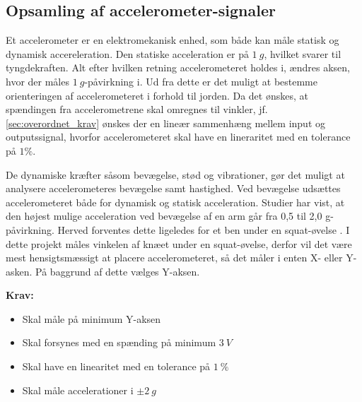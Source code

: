 \subsection{Opsamling af accelerometer-signaler} \label{sec:acc_teori}
Et accelerometer er en elektromekanisk enhed, som både kan måle statisk og dynamisk accereleration. Den statiske acceleration er på $1~g$, hvilket svarer til tyngdekraften. Alt efter hvilken retning accelerometeret holdes i, ændres aksen, hvor der måles $1~g$-påvirkning i. Ud fra dette er det muligt at bestemme orienteringen af accelerometeret i forhold til jorden. Da det ønskes, at spændingen fra accelerometrene skal omregnes til vinkler, jf. \autoref{sec:overordnet_krav} ønskes der en lineær sammenhæng mellem input og outputssignal, hvorfor accelerometeret skal have en lineraritet med en tolerance på $1\%$. 

De dynamiske kræfter såsom bevægelse, stød og vibrationer, gør det muligt at analysere accelerometeres bevægelse samt hastighed. Ved bevægelse udsættes accelerometeret både for dynamisk og statisk acceleration. Studier har vist, at den højest mulige acceleration ved bevægelse af en arm går fra 0,5 til 2,0 g-påvirkning. Herved forventes dette ligeledes for et ben under en squat-øvelse \citep{bernmarka2002}. I dette projekt måles vinkelen af knæet under en squat-øvelse, derfor vil det være mest hensigtsmæssigt at placere accelerometeret, så det måler i enten X- eller Y-asken. På baggrund af dette vælges Y-aksen.

\vspace{3mm}

\textbf{Krav:}
\begin{itemize}
\item Skal måle på minimum Y-aksen
\item Skal forsynes med en spænding på minimum $3~V$
\item Skal have en linearitet med en tolerance på $1~\%$
\item Skal måle accelerationer i $\pm 2~g$
\end{itemize}